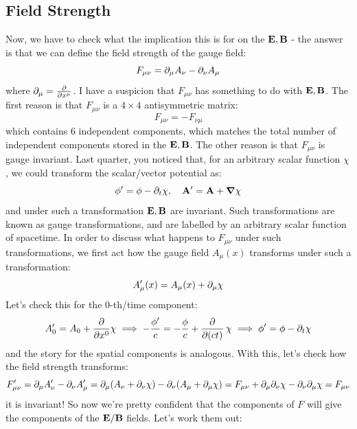 \subsection{Field Strength}
Now, we have to check what the implication this is for on the $\mathbf{E}, \mathbf{B}$ - the answer is that we can define the field strength of the gauge field:
\begin{equation}
    F_{\mu\nu} = \partial_\mu A_\nu - \partial_\nu A_\mu
\end{equation}
where $\partial_\mu = \frac{\partial }{\partial x^\mu}$. I have a suspicion that $F_{\mu\nu}$ has something to do with $\mathbf{E}, \mathbf{B}$. The first reason is that $F_{\mu\nu}$ is a $4\times 4$ antisymmetric matrix:
\begin{equation}
    F_{\mu\nu} = -F_{\nu\mu}
\end{equation}
which contains 6 independent components, which matches the total number of independent components stored in the $\mathbf{E}, \mathbf{B}$. The other reason is that $F_{\mu\nu}$ is gauge invariant. Last quarter, you noticed that, for an arbitrary scalar function $\chi$, we could transform the scalar/vector potential as:
\begin{equation}
    \phi' = \phi - \p_t \chi, \quad \v{A}' = \v{A} + \nabla \chi
\end{equation}
and under such a transformation $\mathbf{E}, \mathbf{B}$ are invariant. Such transformations are known as gauge transformations, and are labelled by an arbitrary scalar function of spacetime. In order to discuss what happens to $F_{\mu\nu}$ under such transformations, we first act how the gauge field $A_\mu(x)$ transforms under such a transformation:
\begin{equation}
    A_\mu'(x) = A_\mu(x) + \partial_\mu \chi
\end{equation}
Let's check this for the 0-th/time component:
\begin{equation}
    A_0' = A_0 + \ddpd{}{x^0}\chi \implies -\frac{\phi'}{c} = -\frac{\phi}{c} + \dpd{}{(ct)}\chi \implies \phi' = \phi - \p_t \chi
\end{equation}
and the story for the spatial components is analogous. With this, let's check how the field strength transforms:
\begin{equation}
    F_{\mu\nu}' = \partial_\mu A_\nu' - \partial_\nu A_\mu' = \partial_\mu(A_\nu + \partial_\nu\chi) - \partial_\nu(A_\mu + \partial_\mu \chi) = F_{\mu\nu} + \partial_\mu\partial_\nu\chi - \partial_\nu\partial_\mu\chi = F_{\mu\nu}
\end{equation}
it is invariant! So now we're pretty confident that the components of $F$ will give the components of the $\mathbf{E}/\mathbf{B}$ fields. Let's work them out:
